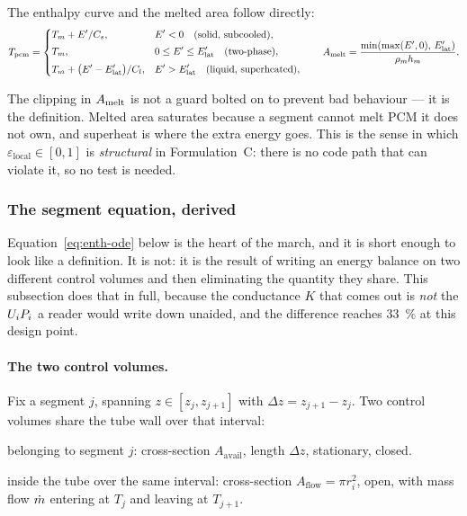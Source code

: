 The enthalpy curve and the melted area follow directly:
\begin{equation}
  T_{\mathrm{pcm}} =
  \begin{dcases}
    T_{m} + E'/C_{s}, & E' < 0 \quad\text{(solid, subcooled)},\\[2pt]
    T_{m}, & 0 \le E' \le E'_{\mathrm{lat}} \quad\text{(two-phase)},\\[2pt]
    T_{m} + \bigl(E'-E'_{\mathrm{lat}}\bigr)/C_{l},
      & E' > E'_{\mathrm{lat}} \quad\text{(liquid, superheated)},
  \end{dcases}
  \qquad
  A_{\mathrm{melt}} = \frac{\min\!\left(\max(E',0),\,E'_{\mathrm{lat}}\right)}{\rho_{m} h_{m}}.
  \label{eq:enth-curve}
\end{equation}

The clipping in $A_{\mathrm{melt}}$ is not a guard bolted on to prevent bad behaviour ---
it is the definition. Melted area saturates because a segment cannot melt PCM it
does not own, and superheat is where the extra energy goes. This is the sense in
which $\varepsilon_{\mathrm{local}}\in[0,1]$ is \emph{structural} in
Formulation~C: there is no code path that can violate it, so no test is needed.

\subsubsection{The segment equation, derived}
\label{sec:front:segeq}

Equation~\eqref{eq:enth-ode} below is the heart of the march, and it is short
enough to look like a definition. It is not: it is the result of writing an
energy balance on two different control volumes and then eliminating the
quantity they share. This subsection does that in full, because the conductance
$K$ that comes out is \emph{not} the $U_{i} P_{i}$ a reader would write down
unaided, and the difference reaches \SI{33}{\percent} at this design point.

\paragraph{The two control volumes.}
Fix a segment $j$, spanning $z\in[z_{j},z_{j+1}]$ with $\Delta z =
z_{j+1}-z_{j}$. Two control volumes share the tube wall over that interval:

\begin{description}[leftmargin=1.9em,itemsep=2pt]
\item[CV\,1 --- the PCM] belonging to segment $j$: cross-section
  $A_{\mathrm{avail}}$, length $\Delta z$, stationary, closed.
\item[CV\,2 --- the fluid] inside the tube over the same interval:
  cross-section $A_{\mathrm{flow}}=\pi r_{i}^{2}$, open, with mass flow $\dot m$
  entering at $T_{j}$ and leaving at $T_{j+1}$.
\end{description}

